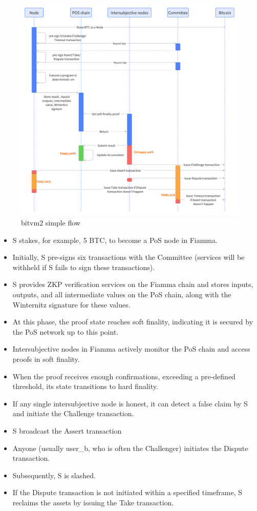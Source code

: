 \begin{figure}[ht] 
    \centering  
    \includegraphics[width=0.85\columnwidth]{images/bitvm2 simple flow.png} 
    \caption{bitvm2 simple flow}
    \label{fig:bitvm2 simple flow}
\end{figure}

\begin{itemize}
    \item S stakes, for example, 5 BTC, to become a PoS node in Fiamma.
    \item Initially, S pre-signs six transactions with the Committee (services will be withheld if S fails to sign these transactions).
    \item S provides ZKP verification services on the Fiamma chain and stores inputs, outputs, and all intermediate values on the PoS chain, along with the Winternitz signature for these values.
    \item At this phase, the proof state reaches soft finality, indicating it is secured by the PoS network up to this point.
    \item Intersubjective nodes in Fiamma actively monitor the PoS chain and access proofs in soft finality.
    \item When the proof receives enough confirmations, exceeding a pre-defined threshold, its state transitions to hard finality.
    \item If any single intersubjective node is honest, it can detect a false claim by S and initiate the Challenge transaction.
    \item S broadcast the Assert transaction
    \item Anyone (usually user\_b, who is often the Challenger) initiates the Dispute transaction.
    \item Subsequently, S is slashed.
    \item If the Dispute transaction is not initiated within a specified timeframe, S reclaims the assets by issuing the Take transaction.
\end{itemize}

